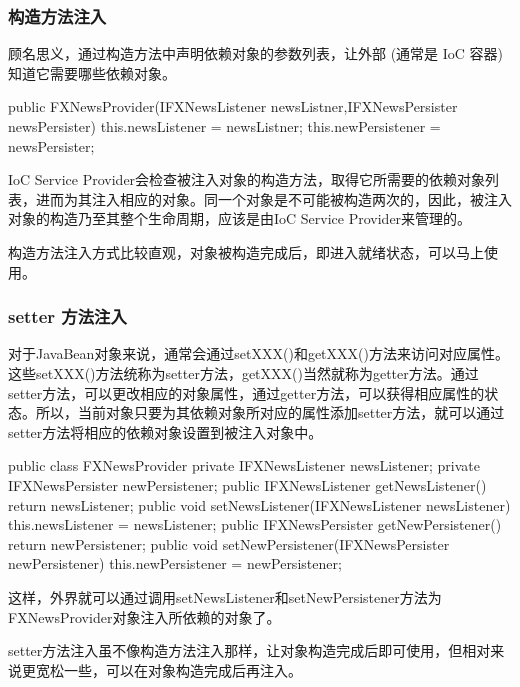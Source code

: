 \subsubsection*{构造方法注入}

顾名思义，通过构造方法中声明依赖对象的参数列表，让外部 (通常是 IoC 容器) 知道它需要哪些依赖对象。

\begin{Java}
public FXNewsProvider(IFXNewsListener newsListner,IFXNewsPersister newsPersister) {   
    this.newsListener   = newsListner; 
    this.newPersistener = newsPersister;
}
\end{Java}

IoC Service Provider会检查被注入对象的构造方法，取得它所需要的依赖对象列表，进而为其注入相应的对象。同一个对象是不可能被构造两次的，因此，被注入对象的构造乃至其整个生命周期，应该是由IoC Service Provider来管理的。

构造方法注入方式比较直观，对象被构造完成后，即进入就绪状态，可以马上使用。

\subsubsection*{setter 方法注入}

对于JavaBean对象来说，通常会通过setXXX()和getXXX()方法来访问对应属性。这些setXXX()方法统称为setter方法，getXXX()当然就称为getter方法。通过setter方法，可以更改相应的对象属性，通过getter方法，可以获得相应属性的状态。所以，当前对象只要为其依赖对象所对应的属性添加setter方法，就可以通过setter方法将相应的依赖对象设置到被注入对象中。

\begin{Java}
public class FXNewsProvider {
    private IFXNewsListener  newsListener;
    private IFXNewsPersister newPersistener;
    public IFXNewsListener getNewsListener() {     
        return  newsListener;    
    }    
    public void setNewsListener(IFXNewsListener newsListener) {     
        this.newsListener = newsListener;   
    }    
    public IFXNewsPersister getNewPersistener() {     
        return  newPersistener;    
    }    
    public void setNewPersistener(IFXNewsPersister newPersistener) {     
        this.newPersistener = newPersistener;   
    }
}
\end{Java}

这样，外界就可以通过调用setNewsListener和setNewPersistener方法为FXNewsProvider对象注入所依赖的对象了。

setter方法注入虽不像构造方法注入那样，让对象构造完成后即可使用，但相对来说更宽松一些，可以在对象构造完成后再注入。

